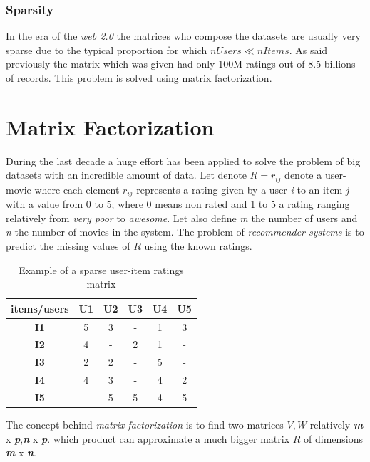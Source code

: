 \documentclass{sig-alternate-05-2015}
\begin{document}
\subsubsection{Sparsity}

In the era of the \textit{web 2.0} the matrices who compose the datasets are
usually very sparse due to the typical proportion for which  \(nUsers \ll nItems\).
As said previously the matrix which was given had only 100M ratings out of
8.5 billions of records. This problem is solved using matrix factorization.

\section{Matrix Factorization}

During the last decade a huge effort has been applied to solve the problem of
big datasets with an incredible amount of data.
Let denote $R = r_{ij}$ denote a
user-movie where each element $r_{ij}$ represents a rating given by
a user \textit{i} to an item \textit{j} with a value from 0 to 5; where 0 means
non rated and 1 to 5 a rating ranging relatively from \textit{very poor} to \textit{awesome}.
Let also define \textit{m} the number of users and \textit{n} the number of movies in the system.
The problem of \textit{recommender systems} is to predict the missing values of $R$
using the known ratings.\\
\begin{table}
\centering
\caption{Example of a sparse user-item ratings matrix}
\begin{tabular}{|c|c|c|c|c|c|} \hline
items/users  & \textbf{U1} & \textbf{U2} & \textbf{U3} & \textbf{U4} & \textbf{U5}\\ \hline
\textbf{I1} & 5 & 3 & - & 1 &  3  \\ \hline
\textbf{I2} & 4 & - & 2 & 1 &  -  \\ \hline
\textbf{I3} & 2 & 2 & - & 5 &  - \\ \hline
\textbf{I4} & 4 & 3 & - & 4 &  2  \\ \hline
\textbf{I5} & - & 5 & 5 & 4 &  5  \\ \hline
\end{tabular}
\end{table}
The concept behind \textit{matrix factorization} is to find two matrices
$V,W$ relatively \textit{\textbf{m}} x \textit{\textbf{p}},\textit{\textbf{n}} x \textit{\textbf{p}}. which product
can approximate a much bigger matrix $R$ of dimensions \textit{\textbf{m}} x \textit{\textbf{n}}.\\
\end{document}
